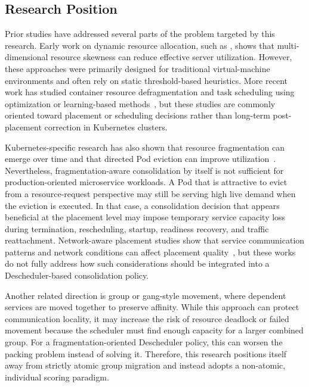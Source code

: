 \subsection{Research Position}
\label{sec:researchPosition}

Prior studies have addressed several parts of the problem targeted by this research. Early work on dynamic resource allocation, such as \cite{xiao2013dynamic}, shows that multi-dimensional resource skewness can reduce effective server utilization. However, these approaches were primarily designed for traditional virtual-machine environments and often rely on static threshold-based heuristics. More recent work has studied container resource defragmentation and task scheduling using optimization or learning-based methods~\cite{guo2025joint,bagaa2024multiobjective}, but these studies are commonly oriented toward placement or scheduling decisions rather than long-term post-placement correction in Kubernetes clusters.

Kubernetes-specific research has also shown that resource fragmentation can emerge over time and that directed Pod eviction can improve utilization~\cite{larsson_klein_elmroth_2023}. Nevertheless, fragmentation-aware consolidation by itself is not sufficient for production-oriented microservice workloads. A Pod that is attractive to evict from a resource-request perspective may still be serving high live demand when the eviction is executed. In that case, a consolidation decision that appears beneficial at the placement level may impose temporary service capacity loss during termination, rescheduling, startup, readiness recovery, and traffic reattachment. Network-aware placement studies show that service communication patterns and network conditions can affect placement quality~\cite{marchese2022network,marchese_tomarchio_2022,chen2024trade}, but these works do not fully address how such considerations should be integrated into a Descheduler-based consolidation policy.

Another related direction is group or gang-style movement, where dependent services are moved together to preserve affinity. While this approach can protect communication locality, it may increase the risk of resource deadlock or failed movement because the scheduler must find enough capacity for a larger combined group. For a fragmentation-oriented Descheduler policy, this can worsen the packing problem instead of solving it. Therefore, this research positions itself away from strictly atomic group migration and instead adopts a non-atomic, individual scoring paradigm.

